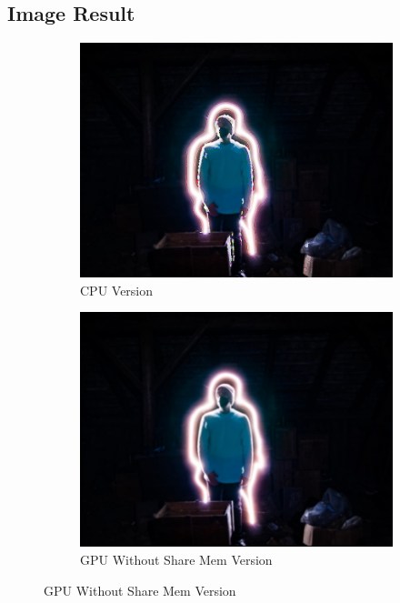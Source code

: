 \documentclass{article}
\begin{document}
\subsection{Image Result}
\begin{figure}
        \begin{subfigure}{\textwidth}
            \includegraphics[width=\textwidth]{./labwork5-cpu-out.jpg}
            \caption{CPU Version}
        \end{subfigure}
        \begin{subfigure}[b]{0.5\textwidth}
            \includegraphics[width=\textwidth]{./labwork5-gpu-out-no-shared.jpg}
            \caption{GPU Without Share Mem Version}
        \end{subfigure}

\end{figure}
\end{document}
